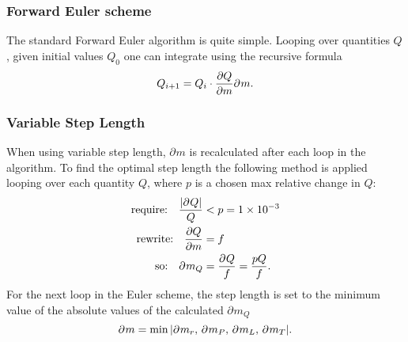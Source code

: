 \documentclass[11pt,a4paper,twocolumn,titlepage]{article}
\begin{document}
\subsubsection{Forward Euler scheme} \label{subsubsec:Method/Euler_scheme}
The standard Forward Euler algorithm is quite simple. Looping over quantities $Q$, given initial values $Q_0$ one can integrate using the recursive formula
\begin{equation}
Q_{i+1} = Q_i \cdot \pdv{Q}{m} \partial^{} m \label{eq:Forward_Euler}.
\end{equation}
\subsubsection{Variable Step Length}\label{subsubsec:Method/Variable_step}
When using variable step length, $\partial^{} m$ is recalculated after each loop in the algorithm. To find the optimal step length the following method is applied looping over each quantity $Q$, where $p$ is a chosen max relative change in $Q$:
\begin{align}
\qq*{require:} \frac{\abs{\partial^{}Q}}{Q} &< p = \num{1e-3} \nonumber
\\
\qq*{rewrite:} \pdv{Q}{m} &= f    \nonumber
\\
\qq*{so:} \partial^{} m_Q &= \frac{\partial^{}Q}{f} = \frac{pQ}{f}. \label{eq:DM_Q}
\end{align}
For the next loop in the Euler scheme, the step length is set to the minimum value of the absolute values of the calculated ${\partial^{} m_Q}$\begin{equation}
\partial^{}m = \min{\abs{\partial^{} m_r,\, \partial^{} m_P,\, \partial^{} m_L,\, \partial^{} m_T}}. \label{eq:min_variable_step_length}
\end{equation}

\end{document}
